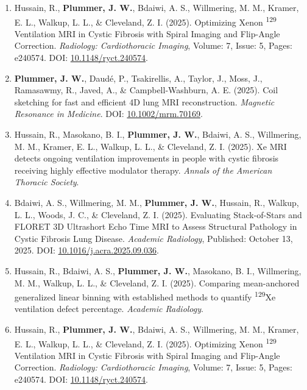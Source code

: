 \documentclass[12pt,]{scrartcl}
\begin{document}
\begin{enumerate}
    \item Hussain, R., \textbf{Plummer, J. W.}, Bdaiwi, A. S., Willmering, M. M., Kramer, E. L., Walkup, L. L., \& Cleveland, Z. I. (2025). Optimizing Xenon \textsuperscript{129} Ventilation MRI in Cystic Fibrosis with Spiral Imaging and Flip-Angle Correction. \textit{Radiology: Cardiothoracic Imaging}, Volume: 7, Issue: 5, Pages: e240574. DOI: \href{https://doi.org/10.1148/ryct.240574}{10.1148/ryct.240574}.

    \item \textbf{Plummer, J. W.}, Daudé, P., Tsakirellis, A., Taylor, J., Moss, J., Ramasawmy, R., Javed, A., \& Campbell-Washburn, A. E. (2025). Coil sketching for fast and efficient 4D lung MRI reconstruction. \textit{Magnetic Resonance in Medicine}. DOI: \href{https://doi.org/10.1002/mrm.70169}{10.1002/mrm.70169}.

    \item Hussain, R., Masokano, B. I., \textbf{Plummer, J. W.}, Bdaiwi, A. S., Willmering, M. M., Kramer, E. L., Walkup, L. L., \& Cleveland, Z. I. (2025). Xe MRI detects ongoing ventilation improvements in people with cystic fibrosis receiving highly effective modulator therapy. \textit{Annals of the American Thoracic Society}.
    
    \item Bdaiwi, A. S., Willmering, M. M., \textbf{Plummer, J. W.}, Hussain, R., Walkup, L. L., Woods, J. C., \& Cleveland, Z. I. (2025). Evaluating Stack-of-Stars and FLORET 3D Ultrashort Echo Time MRI to Assess Structural Pathology in Cystic Fibrosis Lung Disease. \textit{Academic Radiology}, Published: October 13, 2025. DOI: \href{https://doi.org/10.1016/j.acra.2025.09.036}{10.1016/j.acra.2025.09.036}.

    \item Hussain, R., Bdaiwi, A. S., \textbf{Plummer, J. W.}, Masokano, B. I., Willmering, M. M., Walkup, L. L., \& Cleveland, Z. I. (2025). Comparing mean-anchored generalized linear binning with established methods to quantify \textsuperscript{129}Xe ventilation defect percentage. \textit{Academic Radiology}.

    \item Hussain, R., \textbf{Plummer, J. W.}, Bdaiwi, A. S., Willmering, M. M., Kramer, E. L., Walkup, L. L., \& Cleveland, Z. I. (2025). Optimizing Xenon \textsuperscript{129} Ventilation MRI in Cystic Fibrosis with Spiral Imaging and Flip-Angle Correction. \textit{Radiology: Cardiothoracic Imaging}, Volume: 7, Issue: 5, Pages: e240574. DOI: \href{https://doi.org/10.1148/ryct.240574}{10.1148/ryct.240574}.


\end{enumerate}
\end{document}
